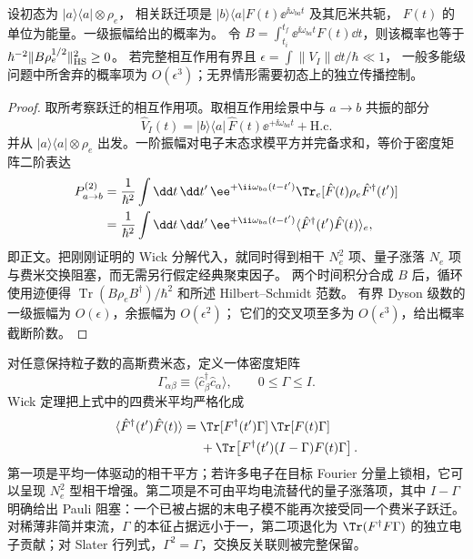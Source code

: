 \begin{proposition}[束流驱动的二阶靶激发概率]
设初态为 $|a\rangle\langle a|\otimes\rho_e$，
相关跃迁项是 $|b\rangle\langle a|F(t)\ee^{\ii\omega_{ba}t}$ 及其厄米共轭，
$F(t)$ 的单位为能量。一级振幅给出的概率为。
令 $B=\int_{t_i}^{t_f}\ee^{\ii\omega_{ba}t}F(t)\dd t$，则该概率也等于
$\hbar^{-2}\|B\rho_e^{1/2}\|_{\rm HS}^2\ge0$。
若完整相互作用有界且 $\epsilon=\int\|V_I\|\dd t/\hbar\ll1$，
一般多能级问题中所舍弃的概率项为 $O(\epsilon^3)$；无界情形需要初态上的独立传播控制。
\end{proposition}
\begin{proof}
取所考察跃迁的相互作用项。取相互作用绘景中与 $a\to b$ 共振的部分
\[
\hat V_I(t)
=|b\rangle\langle a|\,
\hat F(t)\ee^{+\ii\omega_{ba}t}
+\mathrm{H.c.}
\]
并从 $|a\rangle\langle a|\otimes\rho_e$ 出发。一阶振幅对电子末态求模平方并完备求和，等价于密度矩阵二阶表达
\begin{align*}
P_{a\to b}^{(2)}
&=\frac1{\hbar^2}
\int\dd t\,\dd t'\,
\ee^{+\ii\omega_{ba}(t-t')}
\Tr_e[
\hat F(t)\rho_e\hat F^\dagger(t')]\\
&=\frac1{\hbar^2}
\int\dd t\,\dd t'\,
\ee^{+\ii\omega_{ba}(t-t')}
\langle\hat F^\dagger(t')\hat F(t)\rangle_e,
\end{align*}
即正文。把刚刚证明的 Wick 分解代入，就同时得到相干 $N_e^2$ 项、量子涨落 $N_e$ 项与费米交换阻塞，而无需另行假定经典聚束因子。
两个时间积分合成 $B$ 后，循环使用迹便得
$\operatorname{Tr}(B\rho_eB^\dagger)/\hbar^2$
和所述 Hilbert--Schmidt 范数。
有界 Dyson 级数的一级振幅为 $O(\epsilon)$，余振幅为 $O(\epsilon^2)$；
它们的交叉项至多为 $O(\epsilon^3)$，给出概率截断阶数。
\end{proof}


对任意保持粒子数的高斯费米态，定义一体密度矩阵
\begin{equation*}
\Gamma_{\alpha\beta}
\equiv
\langle \hat c_\beta^\dagger\hat c_\alpha\rangle,
\qquad
0\le\Gamma\le I .
\end{equation*}
Wick 定理把上式中的四费米平均严格化成
\begin{equation}
{
\begin{aligned}
\langle\hat F^\dagger(t')\hat F(t)\rangle
={}&
\Tr[F^\dagger(t')\Gamma]\,
\Tr[F(t)\Gamma]\\
&+\Tr\!\left[
F^\dagger(t')(I-\Gamma)F(t)\Gamma
\right].
\end{aligned}}
\label{eq:fermionic_beam_coherent_incoherent_split}
\end{equation}
第一项是平均一体驱动的相干平方；若许多电子在目标 Fourier 分量上锁相，它可以呈现 $N_e^2$ 型相干增强。第二项是不可由平均电流替代的量子涨落项，其中 $I-\Gamma$ 明确给出 Pauli 阻塞：一个已被占据的末电子模不能再次接受同一个费米子跃迁。对稀薄非简并束流，$\Gamma$ 的本征占据远小于一，第二项退化为 $\Tr(F^\dagger F\Gamma)$ 的独立电子贡献；对 Slater 行列式，$\Gamma^2=\Gamma$，交换反关联则被完整保留。

